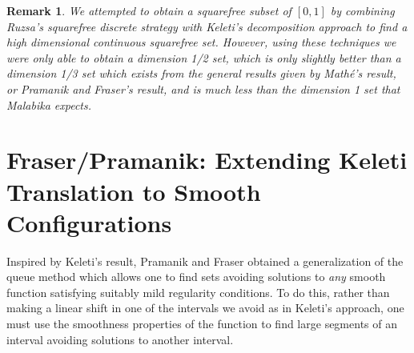 \documentclass{report}
\theoremstyle{plain}
\theoremstyle{plain}
\newtheorem*{remark}{Remark}
\begin{document}
\begin{remark}
    We attempted to obtain a squarefree subset of $[0,1]$ by combining Ruzsa's squarefree discrete strategy with Keleti's decomposition approach to find a high dimensional continuous squarefree set. However, using these techniques we were only able to obtain a dimension 1/2 set, which is only slightly better than a dimension 1/3 set which exists from the general results given by Math\'{e}'s result, or Pramanik and Fraser's result, and is much less than the dimension 1 set that Malabika expects.
\end{remark}







\section{Fraser/Pramanik: Extending Keleti Translation to Smooth Configurations}

Inspired by Keleti's result, Pramanik and Fraser obtained a generalization of the queue method which allows one to find sets avoiding solutions to {\it any} smooth function satisfying suitably mild regularity conditions. To do this, rather than making a linear shift in one of the intervals we avoid as in Keleti's approach, one must use the smoothness properties of the function to find large segments of an interval avoiding solutions to another interval.
\end{document}
